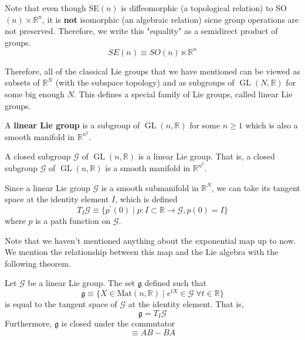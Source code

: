 \documentclass{article}
\DeclareMathOperator{\GL}{GL}
\begin{document}
    Note that even though SE$(n)$ is diffeomorphic (a topological relation) to SO$(n) \times \mathbb{R}^n$, it is \textbf{not} isomorphic (an algebraic relation) sicne group operations are not preserved. Therefore, we write this "equality" as a semidirect product of groups. 
    \begin{equation}
      SE(n) \equiv SO(n) \ltimes \mathbb{R}^n
    \end{equation}

    Therefore, all of the classical Lie groups that we have mentioned can be viewed as subsets of $\mathbb{R}^N$ (with the subspace topology) and as subgroups of $\GL(N, \mathbb{R})$ for some big enough $N$. This defines a special family of Lie groups, called linear Lie groups. 

    \begin{definition}
      A \textbf{linear Lie group} is a subgroup of $\GL(n, \mathbb{R})$ for some $n \geq 1$ which is also a smooth manifold in $\mathbb{R}^{n^2}$. 
    \end{definition}

    \begin{theorem}
      A closed subgroup $\mathcal{G}$ of $\GL(n, \mathbb{R})$ is a linear Lie group. That is, a closed subgroup $\mathcal{G}$ of $\GL(n, \mathbb{R})$ is a smooth manifold in $\mathbb{R}^{n^2}$.
    \end{theorem}

    \begin{definition}
      Since a linear Lie group $\mathcal{G}$ is a smooth submanifold in $\mathbb{R}^N$, we can take its tangent space at the identity element $I$, which is defined 
      \begin{equation}
        T_I \mathcal{G} \equiv \{p^\prime (0) \;|\; p: I \subset \mathbb{R} \longrightarrow \mathcal{G}, p(0) = I\}
      \end{equation}
      where $p$ is a path function on $\mathcal{G}$. 
    \end{definition}

    Note that we haven't mentioned anything about the exponential map up to now. We mention the relationship between this map and the Lie algebra with the following theorem. 

    \begin{theorem}
      Let $\mathcal{G}$ be a linear Lie group. The set $\mathfrak{g}$ defined such that
      \begin{equation}
        \mathfrak{g} \equiv \{X \in \text{Mat}(n, \mathbb{R}) \; | \; e^{t X} \in \mathcal{G} \; \forall t \in \mathbb{R}\}
      \end{equation}
      is equal to the tangent space of $\mathcal{G}$ at the identity element. That is, 
      \begin{equation}
        \mathfrak{g} = T_I \mathcal{G}
      \end{equation}
      Furthermore, $\mathfrak{g}$ is closed under the commutator 
      \begin{equation}
        [A,B] \equiv A B - B A
      \end{equation}
    \end{theorem}
\end{document}
